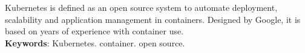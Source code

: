 \begin{resumo}[ABSTRACT]
\begin{SingleSpacing}


Kubernetes is defined as an open source system to automate deployment,
scalability and application management in containers. Designed by Google, it is based on
years of experience with container use.
\\

\textbf{Keywords}: Kubernetes. container. open source.

\end{SingleSpacing}
\end{resumo}

